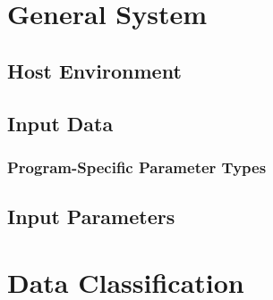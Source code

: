 


\pnumoff\part{General System}\pnumon

\chapter{Host Environment}
  

\chapter{Input Data}
    

    \section{Program-Specific Parameter Types}


\chapter{Input Parameters}
    



\pnumoff\part{Data Classification}\pnumon
  

